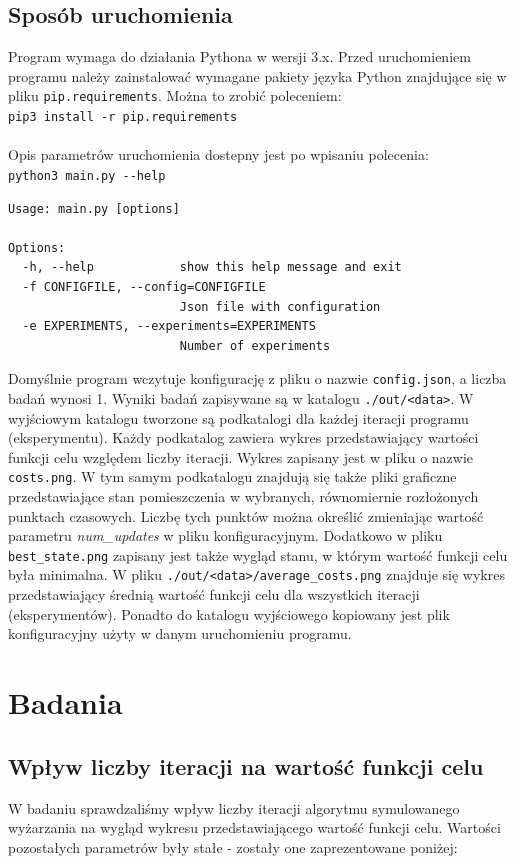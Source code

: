 \documentclass[12pt,a4paper]{article}
\begin{document}
\subsection{Sposób uruchomienia}
Program wymaga do działania Pythona w wersji 3.x.
Przed uruchomieniem programu należy zainstalować wymagane pakiety języka Python
znajdujące się w pliku \texttt{pip.requirements}. Można to zrobić poleceniem:\\
\texttt{pip3 install -r pip.requirements}\\\\
Opis parametrów uruchomienia dostepny jest po wpisaniu polecenia:\\
\texttt{python3 main.py -{}-help}
\begin{verbatim}
Usage: main.py [options]

Options:
  -h, --help            show this help message and exit
  -f CONFIGFILE, --config=CONFIGFILE
                        Json file with configuration
  -e EXPERIMENTS, --experiments=EXPERIMENTS
                        Number of experiments
\end{verbatim}
Domyślnie program wczytuje konfigurację z pliku o nazwie \texttt{config.json},
a liczba badań wynosi 1. Wyniki badań zapisywane są w katalogu
\texttt{./out/<data>}. W wyjściowym katalogu tworzone są podkatalogi dla
każdej iteracji programu (eksperymentu). Każdy podkatalog zawiera wykres
przedstawiający wartości funkcji celu względem liczby iteracji. Wykres zapisany
jest w pliku o nazwie \texttt{costs.png}. W tym samym podkatalogu znajdują
się także pliki graficzne przedstawiające stan pomieszczenia w wybranych,
równomiernie rozłożonych punktach czasowych. Liczbę tych punktów można
określić zmieniając wartość parametru \emph{num\_updates} w pliku konfiguracyjnym.
Dodatkowo w pliku \texttt{best\_state.png} zapisany jest także wygląd stanu,
w którym wartość funkcji celu była minimalna.
W pliku \texttt{./out/<data>/average\_costs.png} znajduje się wykres przedstawiający
średnią wartość funkcji celu dla wszystkich iteracji (eksperymentów).
Ponadto do katalogu wyjściowego kopiowany jest plik konfiguracyjny użyty w danym
uruchomieniu programu.


\section{Badania}
\subsection{Wpływ liczby iteracji na wartość funkcji celu}
W badaniu sprawdzaliśmy wpływ liczby iteracji algorytmu symulowanego wyżarzania
na wygląd wykresu przedstawiającego wartość funkcji celu.
Wartości pozostałych parametrów były stałe - zostały one zaprezentowane poniżej:
\end{document}
